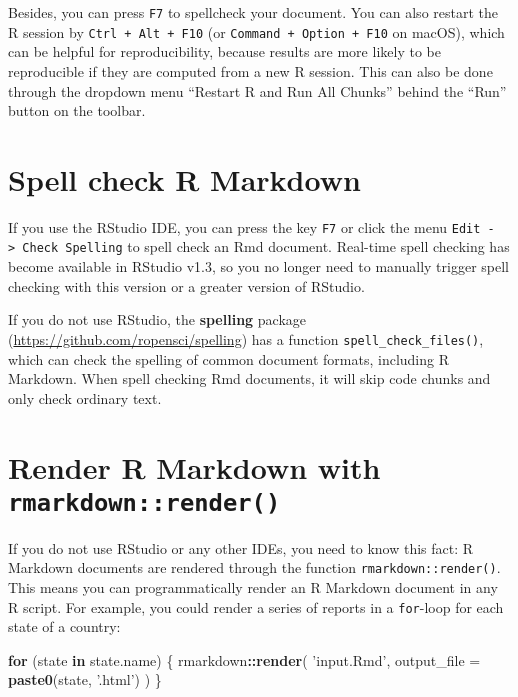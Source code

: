 \documentclass[
  11pt,
]{krantz}
\newenvironment{Shaded}{\begin{snugshade}}{\end{snugshade}}
\newcommand{\ControlFlowTok}[1]{\textcolor[rgb]{0.27,0.27,0.27}{\textbf{#1}}}
\newcommand{\DataTypeTok}[1]{\textcolor[rgb]{0.27,0.27,0.27}{#1}}
\newcommand{\KeywordTok}[1]{\textcolor[rgb]{0.27,0.27,0.27}{\textbf{#1}}}
\newcommand{\NormalTok}[1]{#1}
\newcommand{\OperatorTok}[1]{\textcolor[rgb]{0.43,0.43,0.43}{\textbf{#1}}}
\newcommand{\StringTok}[1]{\textcolor[rgb]{0.5,0.5,0.5}{#1}}
\begin{document}
Besides, you can press \texttt{F7} to spellcheck your document. You can also restart the R session by \texttt{Ctrl\ +\ Alt\ +\ F10} (or \texttt{Command\ +\ Option\ +\ F10} on macOS), which can be helpful for reproducibility, because results are more likely to be reproducible if they are computed from a new R session. This can also be done through the dropdown menu ``Restart R and Run All Chunks'' behind the ``Run'' button on the toolbar.

\hypertarget{spell-check}{%
\section{Spell check R Markdown}\label{spell-check}}

If you use the RStudio IDE, you can press the key \texttt{F7} or click the menu \texttt{Edit\ -\textgreater{}\ Check\ Spelling} to spell check an Rmd document. Real-time spell checking has become available in RStudio v1.3, so you no longer need to manually trigger spell checking with this version or a greater version of RStudio.

If you do not use RStudio, the \textbf{spelling} package (\url{https://github.com/ropensci/spelling}) has a function \texttt{spell\_check\_files()}, which can check the spelling of common document formats, including R Markdown. When spell checking Rmd documents, it will skip code chunks and only check ordinary text.

\hypertarget{rmarkdown-render}{%
\section{\texorpdfstring{Render R Markdown with \texttt{rmarkdown::render()}}{Render R Markdown with rmarkdown::render()}}\label{rmarkdown-render}}

If you do not use RStudio or any other IDEs, you need to know this fact: R Markdown documents are rendered through the function \texttt{rmarkdown::render()}. This means you can programmatically render an R Markdown document in any R script. For example, you could render a series of reports in a \texttt{for}-loop for each state of a country:

\begin{Shaded}
\begin{Highlighting}[]
\ControlFlowTok{for}\NormalTok{ (state }\ControlFlowTok{in}\NormalTok{ state.name) \{}
\NormalTok{  rmarkdown}\OperatorTok{::}\KeywordTok{render}\NormalTok{(}
    \StringTok{'input.Rmd'}\NormalTok{, }\DataTypeTok{output_file =} \KeywordTok{paste0}\NormalTok{(state, }\StringTok{'.html'}\NormalTok{)}
\NormalTok{  )}
\NormalTok{\}}
\end{Highlighting}
\end{Shaded}
\end{document}
